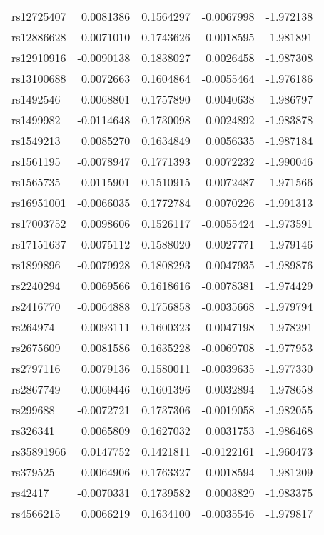 \documentclass[
]{article}
\theoremstyle{plain}
\begin{document}
\begin{longtable}[t]{lrrrr}
\addlinespace
rs12725407 & 0.0081386 & 0.1564297 & -0.0067998 & -1.972138\\
rs12886628 & -0.0071010 & 0.1743626 & -0.0018595 & -1.981891\\
rs12910916 & -0.0090138 & 0.1838027 & 0.0026458 & -1.987308\\
rs13100688 & 0.0072663 & 0.1604864 & -0.0055464 & -1.976186\\
rs1492546 & -0.0068801 & 0.1757890 & 0.0040638 & -1.986797\\
\addlinespace
rs1499982 & -0.0114648 & 0.1730098 & 0.0024892 & -1.983878\\
rs1549213 & 0.0085270 & 0.1634849 & 0.0056335 & -1.987184\\
rs1561195 & -0.0078947 & 0.1771393 & 0.0072232 & -1.990046\\
rs1565735 & 0.0115901 & 0.1510915 & -0.0072487 & -1.971566\\
rs16951001 & -0.0066035 & 0.1772784 & 0.0070226 & -1.991313\\
\addlinespace
rs17003752 & 0.0098606 & 0.1526117 & -0.0055424 & -1.973591\\
rs17151637 & 0.0075112 & 0.1588020 & -0.0027771 & -1.979146\\
rs1899896 & -0.0079928 & 0.1808293 & 0.0047935 & -1.989876\\
rs2240294 & 0.0069566 & 0.1618616 & -0.0078381 & -1.974429\\
rs2416770 & -0.0064888 & 0.1756858 & -0.0035668 & -1.979794\\
\addlinespace
rs264974 & 0.0093111 & 0.1600323 & -0.0047198 & -1.978291\\
rs2675609 & 0.0081586 & 0.1635228 & -0.0069708 & -1.977953\\
rs2797116 & 0.0079136 & 0.1580011 & -0.0039635 & -1.977330\\
rs2867749 & 0.0069446 & 0.1601396 & -0.0032894 & -1.978658\\
rs299688 & -0.0072721 & 0.1737306 & -0.0019058 & -1.982055\\
\addlinespace
rs326341 & 0.0065809 & 0.1627032 & 0.0031753 & -1.986468\\
rs35891966 & 0.0147752 & 0.1421811 & -0.0122161 & -1.960473\\
rs379525 & -0.0064906 & 0.1763327 & -0.0018594 & -1.981209\\
rs42417 & -0.0070331 & 0.1739582 & 0.0003829 & -1.983375\\
rs4566215 & 0.0066219 & 0.1634100 & -0.0035546 & -1.979817\\
\addlinespace

\end{longtable}
\end{document}
